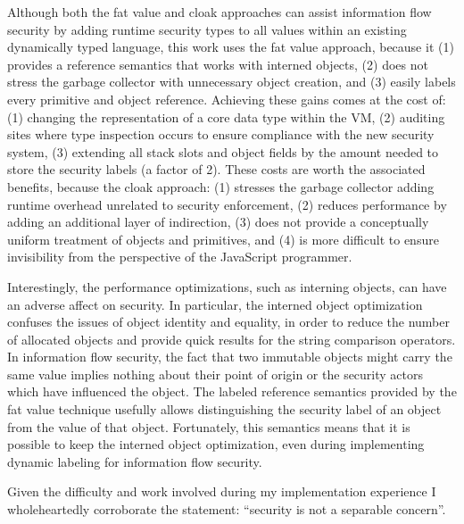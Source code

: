 Although both the fat value and cloak approaches can assist information flow security by adding runtime security types to all values within an existing dynamically typed language, this work uses the fat value approach, because it
(1) provides a reference semantics that works with interned objects,
(2) does not stress the garbage collector with unnecessary object creation,
and (3) easily labels every primitive and object reference.
Achieving these gains comes at the cost of:
(1) changing the representation of a core data type within the VM,
(2) auditing sites where type inspection occurs to ensure compliance with the new security system,
(3) extending all stack slots and object fields by the amount needed to store the security labels (a factor of 2).
These costs are worth the associated benefits, because the cloak approach:
(1) stresses the garbage collector adding runtime overhead unrelated to security enforcement,
(2) reduces performance by adding an additional layer of indirection,
(3) does not provide a conceptually uniform treatment of objects and primitives,
and (4) is more difficult to ensure invisibility from the perspective of the JavaScript programmer.

Interestingly, the performance optimizations, such as interning  objects, can have an adverse affect on security.
In particular, the interned object optimization confuses the issues of object identity and equality, in order to reduce the number of allocated objects and provide quick results for the string comparison operators.
In information flow security, the fact that two immutable objects might carry the same value implies nothing about their point of origin or the security actors which have influenced the object.
The labeled reference semantics provided by the fat value technique usefully allows distinguishing the security label of an object from the value of that object.
Fortunately, this semantics means that it is possible to keep the interned object optimization, even during implementing dynamic labeling for information flow security.

Given the difficulty and work involved during my implementation experience I wholeheartedly corroborate the statement: ``security is not a separable concern''\cite{miller.etal+04}.


